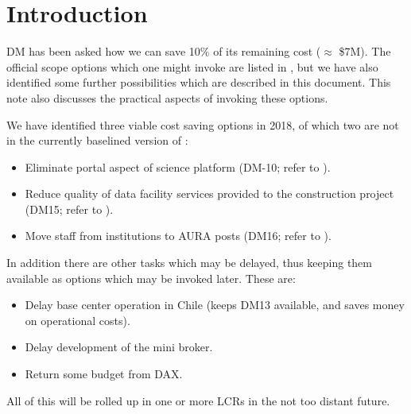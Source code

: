 \section{Introduction}

DM has been asked how we can save 10\% of its remaining cost ($\approx$ \$7M).
The official scope options which one might invoke are listed in , but we have also identified some further possibilities which are described in this document.
This note also discusses the practical aspects of invoking these options.

We have identified three viable cost saving options in 2018, of which two are not in the currently baselined version of :

\begin{itemize}
\item Eliminate portal aspect of science platform (DM-10; refer to ).
\item Reduce quality of data facility services provided to the construction project (DM15; refer to ).
\item Move staff from institutions to AURA posts (DM16; refer to ).
\end{itemize}

In addition there are other tasks which may be delayed, thus keeping them available as options which may be invoked later.
These are:

\begin{itemize}
\item Delay base center operation in Chile (keeps DM13 available, and saves money on operational costs).
\item Delay development of the mini broker.
\item Return some budget from DAX.
\end{itemize}

All of this will be rolled up in one or more LCRs in the not too distant future.
